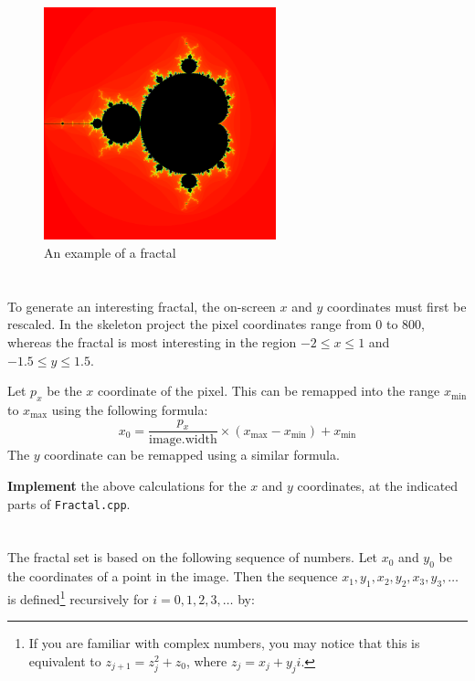 \documentclass{../../../fal_assignment}
\begin{document}
\begin{figure}[!h]
	\begin{center}
		\includegraphics[width=0.6\textwidth]{mandelbrot.png}
	\end{center}
	\caption{An example of a fractal}
	\label{fig:mandelbrot}
\end{figure}

\section{} \label{core-c-first}

To generate an interesting fractal, the on-screen $x$ and $y$ coordinates must first be rescaled.
In the skeleton project the pixel coordinates range from $0$ to $800$,
whereas the fractal is most interesting in the region $-2 \leq x \leq 1$ and $-1.5 \leq y \leq 1.5$.

Let $p_x$ be the $x$ coordinate of the pixel. This can be remapped into the range $x_{\text{min}}$ to $x_{\text{max}}$ using the following formula:
\begin{equation*}
x_0 = \frac{p_x}{\text{image.width}} \times \left( x_{\text{max}} - x_{\text{min}} \right) + x_{\text{min}}
\end{equation*}
The $y$ coordinate can be remapped using a similar formula.

\textbf{Implement} the above calculations for the $x$ and $y$ coordinates, at the indicated parts of \texttt{Fractal.cpp}.

\section{} \label{core-c-last}

The fractal set is based on the following sequence of numbers. Let $x_0$ and $y_0$ be the coordinates of a point in the image.
Then the sequence $x_1, y_1, x_2, y_2, x_3, y_3, \dots$ is defined\footnote{%
	If you are familiar with complex numbers, you may notice that this is equivalent to $z_{j+1} = z_j^2 + z_0$, where $z_j = x_j + y_j i$.
} recursively for $i = 0, 1, 2, 3, \dots$ by:
\end{document}
